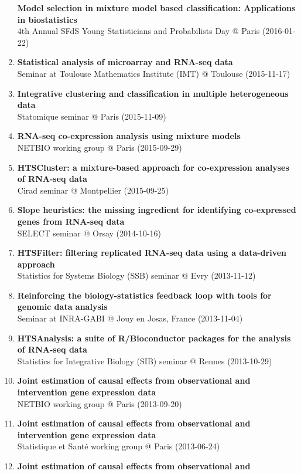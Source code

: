 \documentclass[11pt, a4paper]{awesome-cv}
\begin{document}
\begin{enumerate}
  \textbf{Model selection in mixture model based classification:
  Applications in biostatistics}\\
  4th Annual SFdS Young Statisticians and Probabilists Day @ Paris
  (2016-01-22)
\item
  \textbf{Statistical analysis of microarray and RNA-seq data}\\
  Seminar at Toulouse Mathematics Institute (IMT) @ Toulouse
  (2015-11-17)
\item
  \textbf{Integrative clustering and classification in multiple
  heterogeneous data}\\
  Statomique seminar @ Paris (2015-11-09)
\item
  \textbf{RNA-seq co-expression analysis using mixture models}\\
  NETBIO working group @ Paris (2015-09-29)
\item
  \textbf{HTSCluster: a mixture-based approach for co-expression
  analyses of RNA-seq data}\\
  Cirad seminar @ Montpellier (2015-09-25)
\item
  \textbf{Slope heuristics: the missing ingredient for identifying
  co-expressed genes from RNA-seq data}\\
  SELECT seminar @ Orsay (2014-10-16)
\item
  \textbf{HTSFilter: filtering replicated RNA-seq data using a
  data-driven approach}\\
  Statistics for Systems Biology (SSB) seminar @ Evry (2013-11-12)
\item
  \textbf{Reinforcing the biology-statistics feedback loop with tools
  for genomic data analysis}\\
  Seminar at INRA-GABI @ Jouy en Josas, France (2013-11-04)
\item
  \textbf{HTSAnalysis: a suite of R/Bioconductor packages for the
  analysis of RNA-seq data}\\
  Statistics for Integrative Biology (SIB) seminar @ Rennes (2013-10-29)
\item
  \textbf{Joint estimation of causal effects from observational and
  intervention gene expression data}\\
  NETBIO working group @ Paris (2013-09-20)
\item
  \textbf{Joint estimation of causal effects from observational and
  intervention gene expression data}\\
  Statistique et Santé working group @ Paris (2013-06-24)
\item
  \textbf{Joint estimation of causal effects from observational and
}
\end{enumerate}
\end{document}
